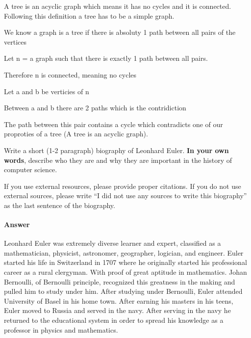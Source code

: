 \documentclass{article}
\begin{document}
{{A tree is an acyclic graph which means it has no cycles and it is connected. Following this definition a tree has to be a simple graph.}

{We know a graph is a tree if there is absoluty 1 path between all pairs of the vertices}

{Let n = a graph such that there is exactly 1 path between all pairs.}

{Therefore n is connected, meaning no cycles}


{Let a and b be verticies of n}

{Between a and b there are 2 paths which is the contridiction}

{The path between this pair contains a cycle which contradicts one of our proproties of a tree (A tree is an acyclic graph).



Write a short (1-2 paragraph) biography of Leonhard Euler.
\textbf{In your own words}, describe who they are and why they are important in
the history of computer science.

If you use external resources, please provide
proper citations. If you do not use external sources, please write ``I did not
use any sources to write this biography'' as the last sentence of the
biography.

\paragraph{Answer}

Leonhard Euler was extremely diverse learner and expert, classified as a
mathematician, physicist, astronomer, geographer, logician, and engineer.
Euler started his life in Switzerland in 1707 where he originally started his
professional career as a rural clergyman. With proof of great aptitude in
mathematics. Johan Bernoulli, of Bernoulli principle, recognized this greatness
in the making and pulled him to study under him. After studying under Bernoulli,
Euler attended University of Basel in his home town. After earning his masters
in his teens, Euler moved to Russia and served in the navy. After serving in the
navy he returned to the educational system in order to spread his knowledge as a
professor in physics and mathematics.

}}
\end{document}
